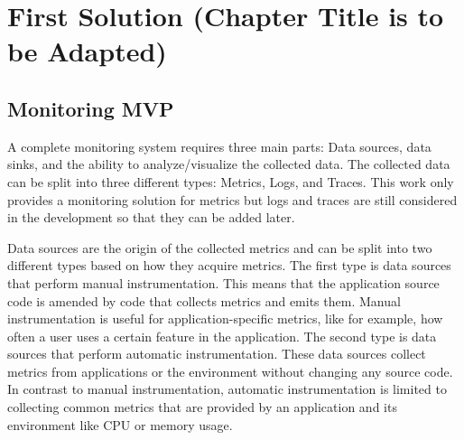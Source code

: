 \chapter{First Solution (Chapter Title is to be Adapted)}



\section{Monitoring MVP}

A complete monitoring system requires three main parts: Data sources, data sinks, and the ability
to analyze/visualize the collected data. 
The collected data can be split into three different types: Metrics, Logs, and Traces.
This work only provides a monitoring solution for metrics but logs and traces are still considered
in the development so that they can be added later.

Data sources are the origin of the collected metrics and can be split into two different types
based on how they acquire metrics. The first type is data sources that perform manual instrumentation.
This means that the application source code is amended by code that collects metrics and emits them.
Manual instrumentation is useful for application-specific metrics, like for example, how often a user
uses a certain feature in the application.
The second type is data sources that perform automatic instrumentation.
These data sources collect metrics from applications or the environment without changing any source code.
In contrast to manual instrumentation, automatic instrumentation is limited to collecting
common metrics that are provided by an application and its environment like CPU or memory usage.

